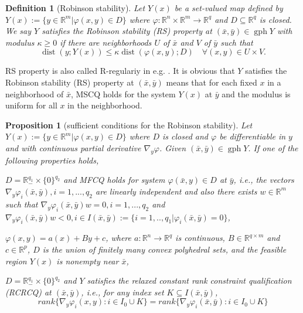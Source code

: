 \documentclass[11pt]{article}
\numberwithin{equation}{section}
\newtheorem{definition}{Definition}[section]
\newtheorem{proposition}{Proposition}[section]
\begin{document}
{\begin{definition}[Robinson stability] \cite[Definition 1.1]{Gfrerer2017}
Let $Y(x)$ be a set-valued map defined by $Y(x):= \{ y\in \mathbb{R}^m | \varphi (x,y) \in D\}$ where $\varphi:\mathbb{R}^n \times \mathbb{R}^m  \to \mathbb{R}^q$ and $D\subseteq \mathbb{R}^{q}$ is closed. We say $Y$ satisfies the Robinson stability (RS) property at $(\bar x,\bar y) \in \operatorname{gph}{Y}$ with modulus $\kappa \geq 0$ if there are neighborhoods $U$ of $\bar x$ and $V$ of  $\bar y$ such that
$$\operatorname{dist}(y; Y(x)) \leq \kappa \operatorname{dist}(\varphi(x,y);D) \quad \forall (x,y)\in U\times V.$$
\end{definition}
RS property is also called R-regulariy in e.g. \cite[Definition 2.6]{Bednarczuk2020}.
It is obvious that $Y$ satisfies the Robinson stability (RS) property at $(\bar x,\bar y)$ means that for each fixed $ x$ in   a neighborhood of $\bar x$, MSCQ holds for the system $Y(x)$ at $\bar y$ and the modulus is uniform  for all $x$ in the neighborhood.
\begin{proposition}[sufficient conditions for the Robinson stability]\label{prop2.3}
Let $Y(x):= \{ y\in \mathbb{R}^m | \varphi (x,y) \in D\}$ where $D$ is closed and $\varphi$ be differentiable in $y$ and with continuous partial derivative $\nabla_y \varphi$. Given $(\bar x,\bar y) \in \operatorname{gph}{Y}$. If one of the following properties holds,
\begin{itemize}
\item[(i)] $D=\mathbb{R}^{q_1}_- \times \{0\}^{q_2}$ and MFCQ holds for system $\varphi(\bar x,y )\in D$   at   $\bar y$, i.e., the vectors $\nabla_y \varphi_i(\bar x,\bar y), i=1,...,q_2$ are linearly independent and also there exists $w \in \mathbb{R}^m$ such that $\nabla_y \varphi_i(\bar x,\bar y)w=0,i=1,...,q_2$ and $\nabla_y \varphi_i(\bar x,\bar y)w<0, i\in I(\bar x,\bar y):=\{i=1,..,q_1 | \varphi_i(\bar x,\bar y)=0\}$, 
\item[(ii)] $\varphi(x, y)=a(x) + By + c$, where $a: \mathbb{R}^n \to \mathbb{R}^q$ is continuous, $B \in \mathbb{R}^{q \times m}$ and $c \in \mathbb{R}^p$, $D$ is the union of finitely many convex polyhedral sets, and the feasible region $Y(x)$ is nonempty near $\bar x$,
{\item[(iii)]  $D=\mathbb{R}^{q_1}_- \times \{0\}^{q_2}$ and $Y$ satisfies the relaxed constant rank constraint qualification (RCRCQ) at $(\bar x,\bar y)$, i.e.,  for any index set $K \subseteq I(\bar x,\bar y)$,
$$rank\{\nabla_y \varphi_i(x,y): i \in I_0 \cup K\} = rank \{\nabla_y \varphi_i (\bar x,\bar y): i \in I_0 \cup K\}$$
}
\end{itemize}
\end{proposition}}
\end{document}
